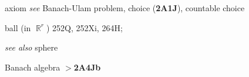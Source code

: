 axiom {\it see} Banach-Ulam problem,
  choice ({\bf 2A1J}),
  countable choice

































































\indexmedskip





































ball (in $\BbbR^r$) 252Q, 252Xi, 264H;
  
  {\it see also} sphere


Banach algebra $\pmb{>}${\bf 2A4Jb}




